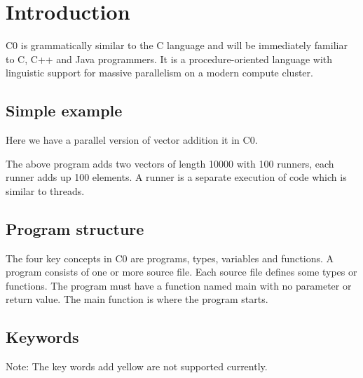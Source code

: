 \documentclass[a4paper]{article}
\DeclareRobustCommand{\mybox}[2][gray!20]{%
\begin{tcolorbox}[   %
        breakable,
        left=0pt,
        right=0pt,
        top=0pt,
        bottom=0pt,
        colback=#1,
        colframe=#1,
        width=\dimexpr\textwidth\relax, 
        enlarge left by=0mm,
        boxsep=5pt,
        arc=0pt,outer arc=0pt,
        ]
        #2
\end{tcolorbox}
}
\begin{document}
\begin{flushleft}
\end{flushleft}

{\color{darkblue}\section{Introduction}}

C0 is grammatically similar to the C language and will be immediately familiar to C, C++ and Java programmers. It is a procedure-oriented language with linguistic support for massive parallelism on a modern compute cluster. 

{\color{lightblue}\subsection{Simple example}}

Here we have a parallel version of vector addition it in C0.

\mybox[gray!20]
{\color{blue}{}}

The above program adds two vectors of length 10000 with 100 runners, each runner adds up 100 elements. A runner is a separate execution of code which is similar to threads.

{\color{lightblue}\subsection{Program structure}}

The four key concepts in C0 are programs, types, variables and functions. A program consists of one or more source file. Each source file defines some types or functions. The program must have a function named main with no parameter or return value. The main function is where the program starts.

{\color{lightblue}\subsection{Keywords}}

Note: The key words add yellow are not supported currently.
\end{document}
